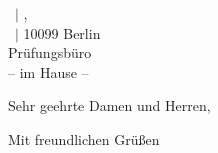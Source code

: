 \documentclass{hu-letter}
\newcommand*\sender{Stefan Müller} %
\newcommand*\degree{Prof. Dr.} %
\newcommand*\authortitle{\degree\ \sender } %
\newcommand*\addressee{Prüfungsbüro}
\begin{document}


\begin{letter}{
\tiny{
	\unishort\ $|$ \faculty ,\\ \institute\ $|$ 10099 Berlin}%
%	
\\ \vspace{1cm}
%
\footnotesize{
 	\addressee \\ -- im Hause --}
}	


\opening{Sehr geehrte Damen und Herren,}



\lipsum[1]


\lipsum[1]


\lipsum[1]


\closing{Mit freundlichen Grüßen}



%
%






\printbibliography[heading=letterbib]


\end{letter}
\end{document}
